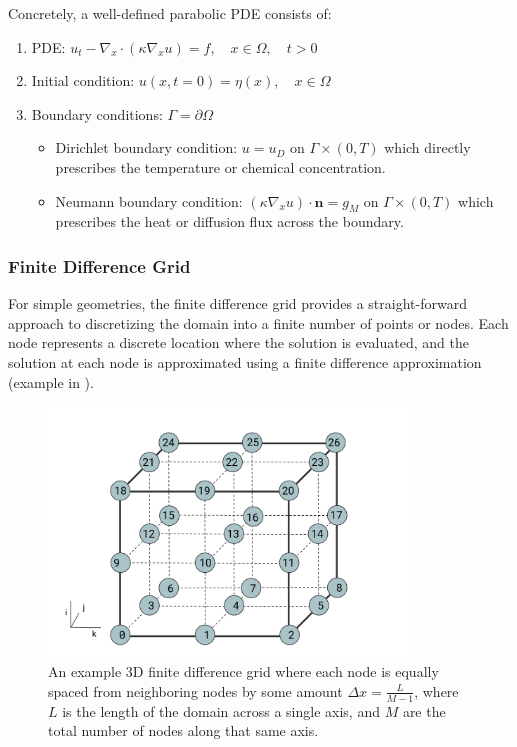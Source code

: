 Concretely, a well-defined parabolic PDE consists of: 

\begin{enumerate}
    \item PDE: \quad\quad\quad\quad\quad\quad\quad $u_t - \nabla_x \cdot (\kappa \nabla_x u) = f, \quad x\in \Omega, \quad t>0$ 
    \item Initial condition: \quad\quad $u(x, t=0) = \eta(x), \quad x \in \Omega$
    \item Boundary conditions: $\Gamma = \partial \Omega$ 
    \begin{itemize}
        \item Dirichlet boundary condition: $u = u_D$ on $\Gamma \times(0, T)$ which directly prescribes the temperature or chemical concentration. 
        \item Neumann boundary condition:   $(\kappa \nabla_x u)\cdot \boldsymbol{n} = g_M$ on $\Gamma \times(0, T)$ which prescribes the heat or diffusion flux across the boundary. 
    \end{itemize}
\end{enumerate}

\subsubsection{Finite Difference Grid}

For simple geometries, the finite difference grid provides a straight-forward approach to discretizing the domain into a finite number of points or nodes. Each node represents a discrete location where the solution is evaluated, and the solution at each node is approximated using a finite difference approximation (example in ). 

\FloatBarrier
\begin{figure}[ht]
   \centering
   \includegraphics[width=0.85\textwidth]{figures/fdgrid.png}
   \caption{An example 3D finite difference grid where each node is equally spaced from neighboring nodes by some amount $\Delta x = \frac{L}{M-1}$, where $L$ is the length of the domain across a single axis, and $M$ are the total number of nodes along that same axis. }
   \label{fig:fdgrid}
\end{figure}
\FloatBarrier

